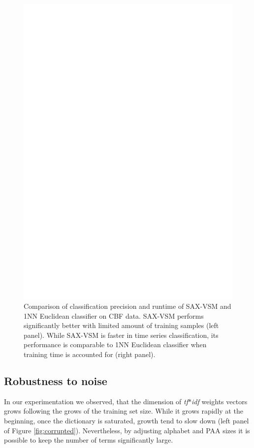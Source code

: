 \documentclass{llncs}
\begin{document}
\begin{figure}[t]
   \centering
   \includegraphics[width=120mm]{figures/precision-runtime.ps}
   \caption{Comparison of classification precision and runtime of SAX-VSM and 1NN 
   Euclidean classifier on CBF data. SAX-VSM performs significantly better with limited 
   amount of training samples (left panel). While SAX-VSM is faster in time series 
   classification, its performance is comparable to 1NN Euclidean classifier when 
   training time is accounted for (right panel).}
   \label{fig:precision-runtime}
\end{figure}

\subsection{Robustness to noise}
In our experimentation we observed, that the dimension of \textit{tf$\ast$idf} weights vectors 
grows following the grows of the training set size. While it grows rapidly at the beginning, once
the dictionary is saturated, growth tend to slow down (left panel of Figure \ref{fig:corrupted}). 
Nevertheless, by adjusting alphabet and PAA sizes it is possible to keep the number of terms
significantly large. 
\end{document}
